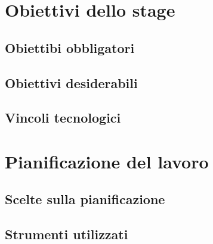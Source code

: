 \section{Obiettivi dello stage}

   \subsection{Obiettibi obbligatori}

   \subsection{Obiettivi desiderabili}

   \subsection{Vincoli tecnologici}

\section{Pianificazione del lavoro}

   \subsection{Scelte sulla pianificazione}

   \subsection{Strumenti utilizzati}